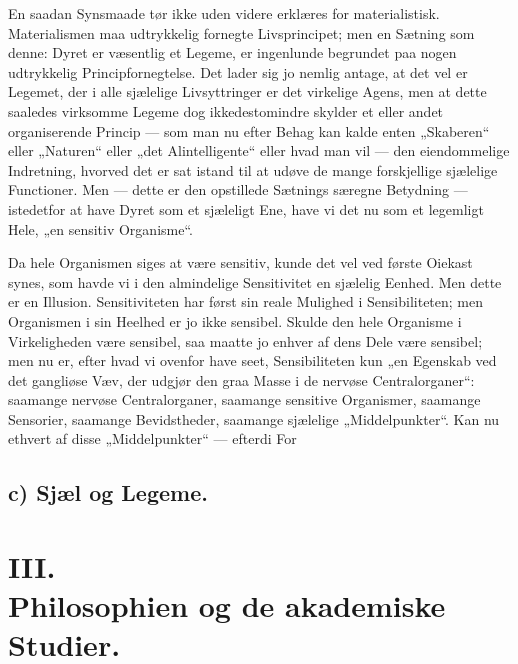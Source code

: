 \documentclass[11pt]{book}
\begin{document}
En saadan Synsmaade tør ikke uden videre erklæres for
materialistisk. Materialismen maa udtrykkelig fornegte Livsprincipet;
men en Sætning som denne: Dyret er væsentlig et Legeme, er ingenlunde
begrundet paa nogen udtrykkelig Principfornegtelse. Det lader sig jo
nemlig antage, at det vel er Legemet, der i alle sjælelige
Livsyttringer er det virkelige Agens, men at dette saaledes
virksomme Legeme dog ikkedestomindre skylder et eller andet
organiserende Princip --- som man nu efter Behag kan kalde enten
„Skaberen“ eller „Naturen“ eller „det Alintelligente“ eller hvad man
vil --- den eiendommelige Indretning, hvorved det er sat istand til
at udøve de mange forskjellige sjælelige Functioner. Men --- dette er
den opstillede Sætnings særegne Betydning --- istedetfor at have
Dyret som et sjæleligt Ene, have vi det nu som et legemligt Hele, „en
sensitiv Organisme“.

Da hele Organismen siges at være sensitiv, kunde det vel ved første
Oiekast synes, som havde vi i den almindelige Sensitivitet en
sjælelig Eenhed. Men dette er en Illusion. Sensitiviteten har først
sin reale Mulighed i Sensibiliteten; men Organismen i sin Heelhed er
jo ikke sensibel. Skulde den hele Organisme i Virkeligheden være
sensibel, saa maatte jo enhver af dens Dele være sensibel; men nu er,
efter hvad vi ovenfor have seet, Sensibiliteten kun „en Egenskab ved
det gangliøse Væv, der udgjør den graa Masse i de nervøse
Centralorganer“: saamange nervøse Centralorganer, saamange sensitive
Organismer, saamange Sensorier, saamange Bevidstheder, saamange
sjælelige „Middelpunkter“. Kan nu ethvert af disse „Middelpunkter“
--- efterdi For\-%



\chapter*{c) Sjæl og Legeme.}





\part*{III.\\ Philosophien og de akademiske Studier.}

\end{document}
